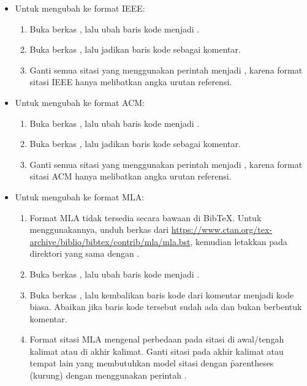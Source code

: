 \begin{itemize}
	\item Untuk mengubah ke format IEEE:
	\begin{enumerate}
		\item Buka berkas , lalu ubah baris kode  menjadi .
		\item Buka berkas , lalu jadikan baris kode  sebagai komentar.
		\item Ganti semua sitasi yang menggunakan perintah  menjadi , karena format sitasi IEEE hanya melibatkan angka urutan referensi.
	\end{enumerate}
	\item Untuk mengubah ke format ACM:
	\begin{enumerate}
		\item Buka berkas , lalu ubah baris kode  menjadi .
		\item Buka berkas , lalu jadikan baris kode  sebagai komentar.
		\item Ganti semua sitasi yang menggunakan perintah  menjadi , karena format sitasi ACM hanya melibatkan angka urutan referensi.
	\end{enumerate}
	\item Untuk mengubah ke format MLA:
	\begin{enumerate}
		\item Format MLA tidak tersedia secara bawaan di BibTeX. Untuk menggunakannya, unduh berkas  dari \url{https://www.ctan.org/tex-archive/biblio/bibtex/contrib/mla/mla.bst}, kemudian letakkan pada direktori yang sama dengan .
		\item Buka berkas , lalu ubah baris kode  menjadi .
		\item Buka berkas , lalu kembalikan baris kode  dari komentar menjadi kode biasa. Abaikan jika baris kode tersebut sudah ada dan bukan berbentuk komentar.
		\item Format sitasi MLA mengenal perbedaan pada sitasi di awal/tengah kalimat atau di akhir kalimat. Ganti sitasi pada akhir kalimat atau tempat lain yang membutuhkan model sitasi dengan \f{parentheses} (kurung) dengan menggunakan perintah .

\end{enumerate}
\end{itemize}

